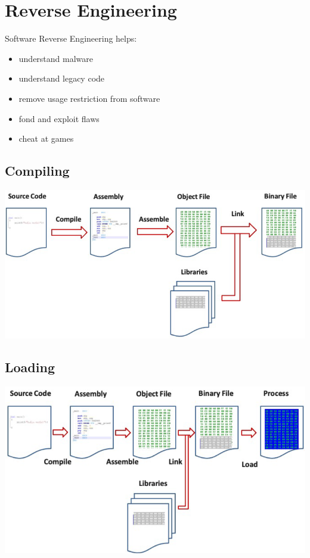 
\section{Reverse Engineering}
Software Reverse Engineering helps:
\begin{itemize}
    \item understand malware
    \item understand legacy code
    \item remove usage restriction from software
    \item fond and exploit flaws 
    \item cheat at games
\end{itemize}

\subsection{Compiling}
\includegraphics[width=\linewidth]{../img/compiling.png}

\subsection{Loading}
\includegraphics[width=\linewidth]{../img/loading.png}

